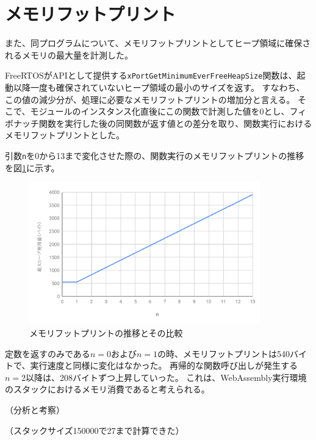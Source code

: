 \section{メモリフットプリント}

また、同プログラムについて、メモリフットプリントとしてヒープ領域に確保されるメモリの最大量を計測した。

FreeRTOSがAPIとして提供する\verb|xPortGetMinimumEverFreeHeapSize|関数は、起動以降一度も確保されていないヒープ領域の最小のサイズを返す。
すなわち、この値の減少分が、処理に必要なメモリフットプリントの増加分と言える。
そこで、モジュールのインスタンス化直後にこの関数で計測した値を0とし、フィボナッチ関数を実行した後の同関数が返す値との差分を取り、関数実行におけるメモリフットプリントとした。

引数\verb|n|を0から13まで変化させた際の、関数実行のメモリフットプリントの推移を図\ref{fig:heap_size}に示す。

\begin{figure}[htbp]
  \caption{メモリフットプリントの推移とその比較}
  \label{fig:heap_size}
  \begin{center}
    \includegraphics[bb=0 0 600 370,width=10cm]{img/heap_size.pdf}
  \end{center}
\end{figure}

定数を返すのみである$n=0$および$n=1$の時、メモリフットプリントは540バイトで、実行速度と同様に変化はなかった。
再帰的な関数呼び出しが発生する$n=2$以降は、208バイトずつ上昇していった。
これは、WebAssembly実行環境のスタックにおけるメモリ消費であると考えられる。

（分析と考察）

（スタックサイズ150000で27まで計算できた）

